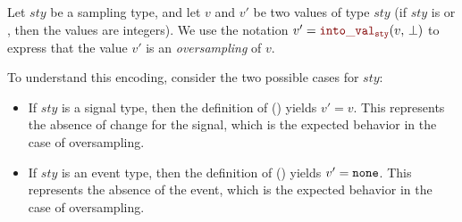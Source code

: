 \begin{remark}
    Let $sty$ be a sampling type, and let $v$ and $v'$ be two values of type $sty$ (\eg if $sty$ is
    \intTY or \mayB{\intTY}, then the values are integers).
    We use the notation $v' = \intoVal{sty}{v}{\bot}$ to express that the value $v'$ is an
    \emph{oversampling} of $v$.

    To understand this encoding, consider the two possible cases for $sty$:
    \begin{itemize}
        \item If $sty$ is a signal type, then the definition of 
              () yields $v' = v$. This
              represents the absence of change for the signal, which is the expected behavior in the
              case of oversampling.

        \item If $sty$ is an event type, then the definition of 
              () yields $v' = \mathtt{{none}}$. This
              represents the absence of the event, which is the expected behavior in the case of
              oversampling.
    \end{itemize}
\end{remark}


